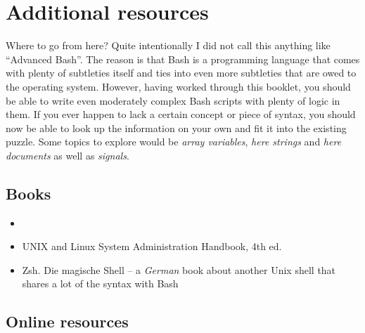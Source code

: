 \documentclass{olli-handout}
\begin{document}
\chapter{Additional resources}

Where to go from here? Quite intentionally I did not call this anything like ``Advanced Bash''. The reason is that Bash is a programming language that comes with plenty of subtleties itself and ties into even more subtleties that are owed to the operating system. However, having worked through this booklet, you should be able to write even moderately complex Bash scripts with plenty of logic in them. If you ever happen to lack a certain concept or piece of syntax, you should now be able to look up the information on your own and fit it into the existing puzzle. Some topics to explore would be \emph{array variables}, \emph{here strings} and \emph{here documents} as well as \emph{signals}.

\section{Books}

\begin{itemize}
	\item[\olliBook] 
	\item[\olliBook] UNIX and Linux System Administration Handbook, 4th ed.
	\item[\olliBook] Zsh. Die magische Shell -- a \emph{German} book about another Unix shell that shares a lot of the syntax with Bash
\end{itemize}

\section{Online resources}
\end{document}
